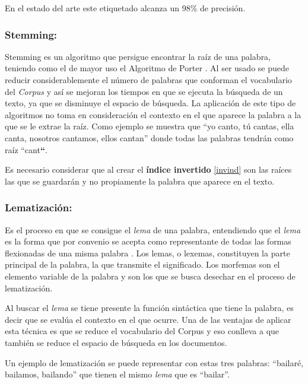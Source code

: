 \documentclass[
  10,
  openany]{book}
\begin{document}
En el estado del arte este etiquetado alcanza un 98\% de precisión.

\hypertarget{steaming}{%
\subsubsection{Stemming:}\label{steaming}}

Stemming es un algoritmo que persigue encontrar la raíz de una palabra, teniendo como el de mayor uso el Algoritmo de Porter \citep{willett2006}. Al ser usado se puede reducir considerablemente el número de palabras que conforman el vocabulario del \emph{Corpus} y así se mejoran los tiempos en que se ejecuta la búsqueda de un texto, ya que se disminuye el espacio de búsqueda. La aplicación de este tipo de algoritmos no toma en consideración el contexto en el que aparece la palabra a la que se le extrae la raíz. Como ejemplo se muestra que ``yo canto, tú cantas, ella canta, nosotros cantamos, ellos cantan'' donde todas las palabras tendrán como raíz ``cant\textbf{``}.

Es necesario considerar que al crear el \textbf{índice invertido} \ref{invind} son las raíces las que se guardarán y no propiamente la palabra que aparece en el texto.

\hypertarget{lemma}{%
\subsubsection{Lematización:}\label{lemma}}

Es el proceso en que se consigue el \emph{lema} de una palabra, entendiendo que el \emph{lema} es la forma que por convenio se acepta como representante de todas las formas flexionadas de una misma palabra \citep{demarneffe2021}. Los lemas, o lexemas, constituyen la parte principal de la palabra, la que transmite el significado. Los morfemas son el elemento variable de la palabra y son los que se busca desechar en el proceso de lematización.

Al buscar el \emph{lema} se tiene presente la función sintáctica que tiene la palabra, es decir que se evalúa el contexto en el que ocurre. Una de las ventajas de aplicar esta técnica es que se reduce el vocabulario del Corpus y eso conlleva a que también se reduce el espacio de búsqueda en los documentos.

Un ejemplo de lematización se puede representar con estas tres palabras: ``bailaré, bailamos, bailando'' que tienen el mismo \emph{lema} que es ``bailar''.
\end{document}
